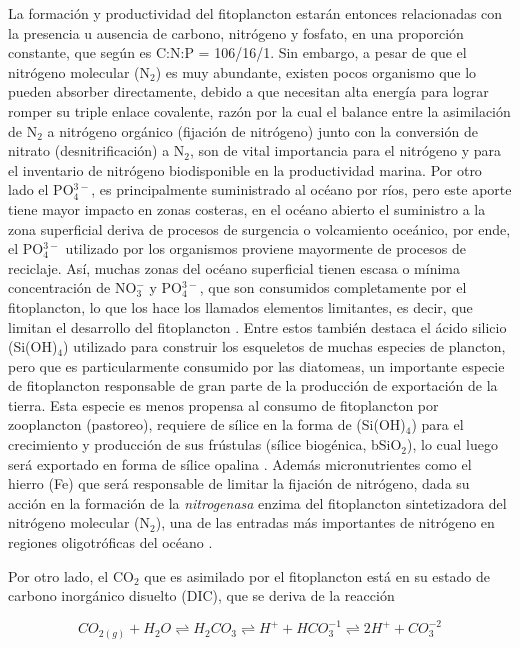 La formación y productividad del fitoplancton estarán entonces relacionadas con la presencia u ausencia de carbono, nitrógeno y fosfato, en una proporción constante, que según \cite{redfield1934proportions} es C:N:P = 106/16/1. Sin embargo, a pesar de que el nitrógeno molecular (N$_2$) es muy abundante, existen pocos organismo que lo pueden absorber directamente, debido a que necesitan alta energía para lograr romper su triple enlace covalente, razón por la cual el balance entre la asimilación de N$_2$ a nitrógeno orgánico (fijación de nitrógeno) junto con la conversión de nitrato (desnitrificación) a N$_2$, son de vital importancia para el nitrógeno y para el inventario de nitrógeno biodisponible en la productividad marina. Por otro lado el PO$_{4}^{3-}$, es principalmente suministrado al océano por ríos, pero este aporte tiene mayor impacto en zonas costeras, en el océano abierto el suministro a la zona superficial deriva de procesos de surgencia o volcamiento oceánico, por ende, el PO$_{4}^{3-}$ utilizado por los organismos proviene mayormente de procesos de reciclaje. Así, muchas zonas del océano superficial tienen escasa o mínima concentración de NO$_{3}^{-}$ y PO$_{4}^{3-}$, que son consumidos completamente por el fitoplancton, lo que los hace los llamados elementos limitantes, es decir, que limitan el desarrollo del fitoplancton \citep{archer2000caused}. Entre estos también destaca el ácido silicio (Si(OH)$_4$) utilizado para construir los esqueletos de muchas especies de plancton, pero que es particularmente consumido por las diatomeas, un importante especie de fitoplancton responsable de gran parte de la producción de exportación de la tierra. Esta especie es menos propensa al consumo de fitoplancton por zooplancton (pastoreo), requiere de sílice en la forma de (Si(OH)$_4$) para el crecimiento y producción de sus frústulas (sílice biogénica, bSiO$_2$), lo cual luego será exportado en forma de sílice opalina \citep{treguer2000global,arellano2011high}. Además micronutrientes como el hierro (Fe) que será responsable de limitar la fijación de nitrógeno, dada su acción en la formación de la \textit{nitrogenasa} enzima del fitoplancton sintetizadora del nitrógeno molecular (N$_2$), una de las entradas más importantes de nitrógeno en regiones oligotróficas del océano \citep{mahaffey2005conundrum,gruber2008marine}. 

Por otro lado, el CO$_2$ que es asimilado por el fitoplancton está en su estado de carbono inorgánico disuelto (DIC), que se deriva de la reacción 

\begin{equation} \label{eq:marco1}
CO_{2 (g)} + H_{2}O\rightleftharpoons H_{2}CO_{3} \rightleftharpoons H^{+} + HCO_{3}^{-1} \rightleftharpoons 2H^{+} + CO_{3}^{-2} 
\end{equation}

